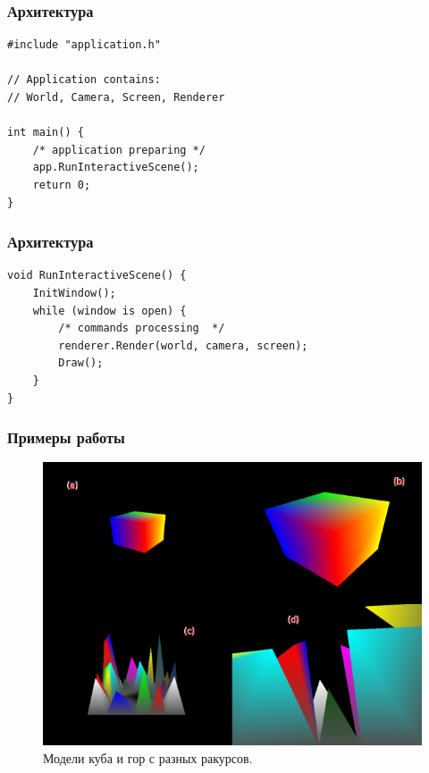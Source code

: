 \documentclass{beamer}
\begin{document}
\begin{frame}[fragile]
\frametitle{Архитектура}

\begin{lstlisting}
#include "application.h"

// Application contains:
// World, Camera, Screen, Renderer

int main() {
    /* application preparing */
    app.RunInteractiveScene();
    return 0;
}
\end{lstlisting}
\end{frame}

\begin{frame}[fragile]
\frametitle{Архитектура}


\begin{lstlisting}
void RunInteractiveScene() {
    InitWindow();
    while (window is open) {
        /* commands processing  */
        renderer.Render(world, camera, screen);
        Draw();
    }
}
\end{lstlisting}
\end{frame}

\begin{frame}
\frametitle{Примеры работы}

\begin{figure}
    \includegraphics[scale=0.3]{rendered models.png}
    \caption*{Модели куба и гор с разных ракурсов.}
\end{figure}
\end{frame}
\end{document}
